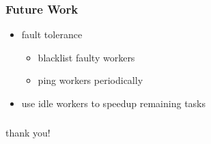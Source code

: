 \documentclass{beamer}
\let\emph\alert
\begin{document}
\begin{frame}\frametitle{Future Work}
  \begin{itemize}
  \item fault tolerance
    \begin{itemize}
    \item blacklist faulty workers
    \item ping workers periodically
    \end{itemize}
  \item use idle workers to speedup remaining tasks
  \end{itemize}
\end{frame}

\begin{frame}\frametitle{}
  \begin{center}
    \emph{thank you!}
  \end{center}
\end{frame}
\end{document}

